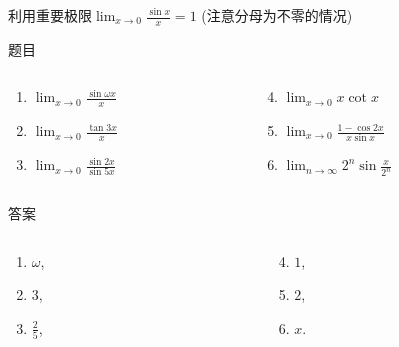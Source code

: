 \documentclass[
10pt,
aspectratio=43,
]{beamer}
\begin{document}
\begin{frame}{利用重要极限$\displaystyle\lim_{x\to0}\frac{\sin x}{x}=1$ (注意分母为不零的情况)}
	\begin{block}{题目}
		\begin{columns}[onlytextwidth]
		  \begin{column}{0.5\textwidth}
			\begin{enumerate}
			  \item $\displaystyle\lim _{x \rightarrow 0} \frac{\sin \omega x}{x}$
			  \item $\displaystyle\lim _{x \rightarrow 0} \frac{\tan 3 x}{x}$
			  \item $\displaystyle\lim _{x \rightarrow 0} \frac{\sin 2 x}{\sin 5 x}$
			\end{enumerate}
		  \end{column}
		  \begin{column}{0.5\textwidth}
			\begin{enumerate}
			  \setcounter{enumi}{3}
			  \item $\displaystyle\lim _{x \rightarrow 0} x \cot x$
			  \item $\displaystyle\lim _{x \rightarrow 0} \frac{1-\cos 2 x}{x \sin x}$
			  \item $\displaystyle\lim _{n \rightarrow \infty} 2^n \sin \frac{x}{2^n}$
			\end{enumerate}
		  \end{column}
		\end{columns}
	  \end{block}
	  \begin{exampleblock}{答案}
		\begin{columns}[onlytextwidth]
			\begin{column}{0.5\textwidth}
				\begin{enumerate}
					\item $\omega$,
					      \pause
					\item $3$,
					      \pause
					\item $\displaystyle\frac{2}{5}$,
				\end{enumerate}
			\end{column}
			\begin{column}{0.5\textwidth}
				\begin{enumerate}
					\setcounter{enumi}{3}
					\pause
					\item $1$,
					      \pause
					\item $2$,
					      \pause
					\item $x$.
				\end{enumerate}
			\end{column}
		\end{columns}
	\end{exampleblock}
\end{frame}
\end{document}
